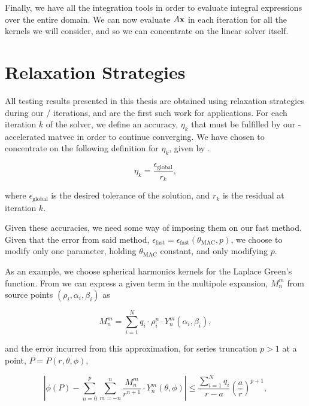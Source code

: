 Finally, we have all the integration tools in order to evaluate integral expressions over the entire domain. We can now evaluate $A\mathbf{x}$ in each {\gmres} iteration for all the kernels we will consider, and so we can concentrate on the linear solver itself.

\section{Relaxation Strategies}\label{subsec:relaxation}

All testing results presented in this thesis are obtained using relaxation strategies during our {\gmres} / {\fgmres} iterations, and are the first such work for {\fmmbem} applications. For each iteration $k$ of the solver, we define an accuracy, $\eta_{k}$ that must be fulfilled by our {\fmm}-accelerated matvec in order to continue converging. We have chosen to concentrate on the following definition for $\eta_{k}$, given by \cite{bourasfraysse2005}. 

\begin{equation} 
	\eta_{k} = \frac{\epsilon_{\text{global}}}{r_{k}},
\end{equation}

\noindent
where $\epsilon_{\text{global}}$ is the desired tolerance of the solution, and $r_k$ is the residual at iteration $k$.

Given these accuracies, we need some way of imposing them on our fast method. Given that the error from said method, $\epsilon_{\text{fast}} = \epsilon_{\text{fast}}(\theta_{\text{MAC}}, p)$, we choose to modify only one parameter, holding $\theta_{\text{MAC}}$ constant, and only modifying $p$.

As an example, we choose spherical harmonics kernels for the Laplace Green's function. From \cite{GreengardRokhlin1987} we can express a given term in the multipole expansion, $M^{m}_{n}$ from source points $(\rho_{i}, \alpha_{i}, \beta_{i})$ as

\begin{equation}\label{eqn:multipole}
	M^{m}_{n} = \sum_{i=1}^{N} q_{i}\cdot\rho_{i}^{n}\cdot Y^{m}_{n}(\alpha_{i}, \beta_{i}),
\end{equation}

\noindent
and the error incurred from this approximation, for series truncation $p > 1$ at a point, $P = P(r, \theta, \phi)$, 

\begin{equation}\label{eqn:multipole_error}
	\left | \phi(P) - \sum_{n=0}^{p}\sum_{m=-n}^{n}\frac{M^{m}_{n}}{r^{n+1}}\cdot Y^{m}_{n}(\theta, \phi) \right | \leq \frac{\sum_{i=1}^{N}q_{i}}{r-a}\left ( \frac{a}{r} \right )^{p+1},
\end{equation}

